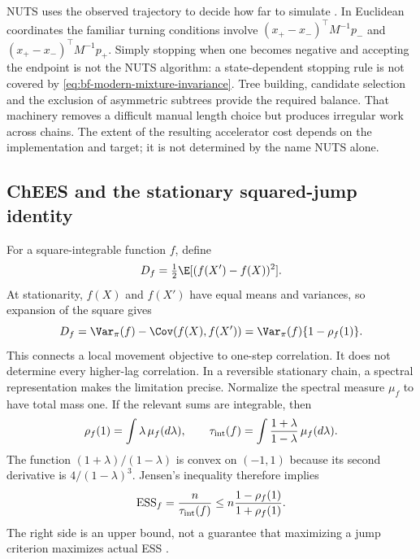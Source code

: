 NUTS uses the observed trajectory to decide how far to simulate
\citep[Section 3.1 and Algorithm 3]{hoffman2014nuts}. In Euclidean coordinates the familiar turning
conditions involve
$(x_+-x_-)^\top M^{-1}p_-$ and
$(x_+-x_-)^\top M^{-1}p_+$. Simply stopping when one becomes negative and
accepting the endpoint is not the NUTS algorithm: a state-dependent stopping
rule is not covered by \eqref{eq:bf-modern-mixture-invariance}. Tree building,
candidate selection and the exclusion of asymmetric subtrees provide the
required balance. That machinery removes a difficult manual length choice
but produces irregular work across chains. The extent of the resulting
accelerator cost depends on the implementation and target; it is not
determined by the name NUTS alone.

\subsection{ChEES and the stationary squared-jump identity}

For a square-integrable function $f$, define
\begin{equation}
 D_f=\tfrac12\E[(f(X')-f(X))^2].
 \label{eq:bf-modern-esjd-definition}
\end{equation}
At stationarity, $f(X)$ and $f(X')$ have equal means and variances, so
expansion of the square gives
\begin{equation}
 D_f=\Var_\pi(f)-\Cov(f(X),f(X'))
     =\Var_\pi(f)\{1-\rho_f(1)\}.
 \label{eq:bf-modern-esjd-identity}
\end{equation}
This connects a local movement objective to one-step correlation. It does
not determine every higher-lag correlation. In a reversible stationary chain,
a spectral representation makes the limitation precise. Normalize the
spectral measure $\mu_f$ to have total mass one. If the relevant sums are
integrable, then
\begin{equation}
 \rho_f(1)=\int\lambda\,\mu_f(d\lambda),\qquad
 \tau_{\rm int}(f)=\int\frac{1+\lambda}{1-\lambda}\,\mu_f(d\lambda).
 \label{eq:bf-modern-spectral-iat}
\end{equation}
The function $(1+\lambda)/(1-\lambda)$ is convex on $(-1,1)$ because
its second derivative is $4/(1-\lambda)^3$. Jensen's inequality therefore
implies
\begin{equation}
 \operatorname{ESS}_f
 =\frac{n}{\tau_{\rm int}(f)}
 \leq n\frac{1-\rho_f(1)}{1+\rho_f(1)}.
 \label{eq:bf-modern-esjd-bound}
\end{equation}
The right side is an upper bound, not a guarantee that maximizing a jump
criterion maximizes actual ESS \citep[Appendix B]{sountsov2022snaper}.

